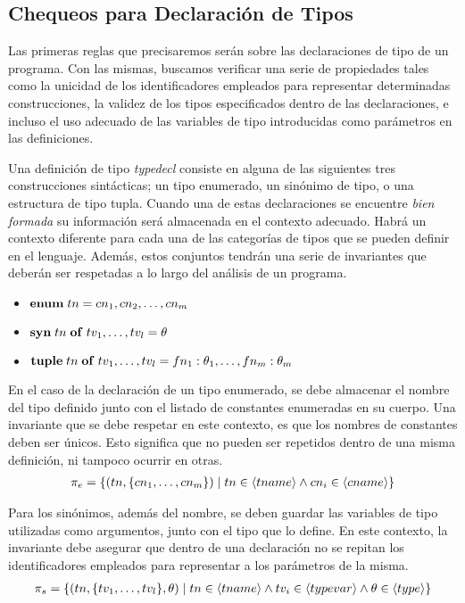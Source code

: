 \subsection{Chequeos para Declaración de Tipos}

Las primeras reglas que precisaremos serán sobre las declaraciones de tipo de un programa.
Con las mismas, buscamos verificar una serie de propiedades tales como la unicidad de los identificadores empleados para representar determinadas construcciones, la validez de los tipos especificados dentro de las declaraciones, e incluso el uso adecuado de las variables de tipo introducidas como parámetros en las definiciones.

Una definición de tipo \textit{typedecl} consiste en alguna de las siguientes tres construcciones sintácticas; un tipo enumerado, un sinónimo de tipo, o una estructura de tipo tupla.
Cuando una de estas declaraciones se encuentre \textit{bien formada} su información será almacenada en el contexto adecuado.
Habrá un contexto diferente para cada una de las categorías de tipos que se pueden definir en el lenguaje.
Además, estos conjuntos tendrán una serie de invariantes que deberán ser respetadas a lo largo del análisis de un programa.

\begin{itemize}
    \item $\mathbf{enum} \; tn = cn_1, cn_2, \ldots, cn_m$
    \item $\mathbf{syn} \; tn \; \mathbf{of} \; tv_1, \ldots, tv_l = \theta$
    \item $\mathbf{tuple} \; tn \; \mathbf{of} \; tv_1, \ldots, tv_l = fn_1 : \theta_1, \ldots, fn_m : \theta_m$
\end{itemize}

En el caso de la declaración de un tipo enumerado, se debe almacenar el nombre del tipo definido junto con el listado de constantes enumeradas en su cuerpo.
Una invariante que se debe respetar en este contexto, es que los nombres de constantes deben ser únicos.
Esto significa que no pueden ser repetidos dentro de una misma definición, ni tampoco ocurrir en otras.
\begin{gather*}
\pi_{e} =
\{ 
(tn, \{ cn_1, \ldots, cn_m \} ) \mid 
tn \in \langle tname \rangle 
\wedge 
cn_i \in \langle cname \rangle
\}
\end{gather*}

Para los sinónimos, además del nombre, se deben guardar las variables de tipo utilizadas como argumentos, junto con el tipo que lo define.
En este contexto, la invariante debe asegurar que dentro de una declaración no se repitan los identificadores empleados para representar a los parámetros de la misma.
\begin{gather*}
\pi_{s} =
\{
(tn, \{ tv_1, \ldots, tv_l \} , \theta) \mid 
tn \in \langle tname \rangle
\wedge
tv_i \in \langle typevar \rangle
\wedge
\theta \in \langle type \rangle
\}
\end{gather*}

